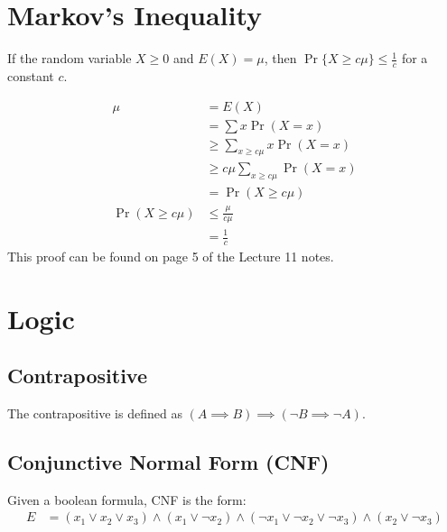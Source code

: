         \section{Markov's Inequality} %
        \label{sec:markov_s_inequality}
            If the random variable $X \ge 0$ and $E(X) = \mu$, then $\Pr\{ X \ge c \mu \} \le \frac{1}{c}$ for a constant $c$.

            \begin{align*}
                \mu &= E(X) \\
                &= \sum x \Pr(X = x) \\
                &\ge \sum_{x \ge c \mu} x \Pr(X = x) \\
                &\ge c \mu \sum_{x \ge c \mu} \Pr(X = x) \\
                &= \Pr(X \ge c \mu) \\
                \Pr(X \ge c \mu) &\le \frac{\mu}{c \mu} \\
                &= \frac{1}{c}
            \end{align*}
            This proof can be found on page 5 of the Lecture 11 notes.
        \section{Logic} %
        \label{sec:logic}
            \subsection{Contrapositive} %
            \label{sub:contrapositive}
                The contrapositive is defined as $(A \implies B) \implies (\lnot B \implies \lnot A)$.
            \subsection{Conjunctive Normal Form (CNF)} %
            \label{sub:conjunctive_normal_form_}
                Given a boolean formula, \textsc{CNF} is the form:
                \begin{align*}
                    E &= (x_1 \lor x_2 \lor x_3) \land (x_1 \lor \lnot x_2) \land (\lnot x_1 \lor \lnot x_2 \lor \lnot x_3) \land (x_2 \lor \lnot x_3)
                \end{align*}


